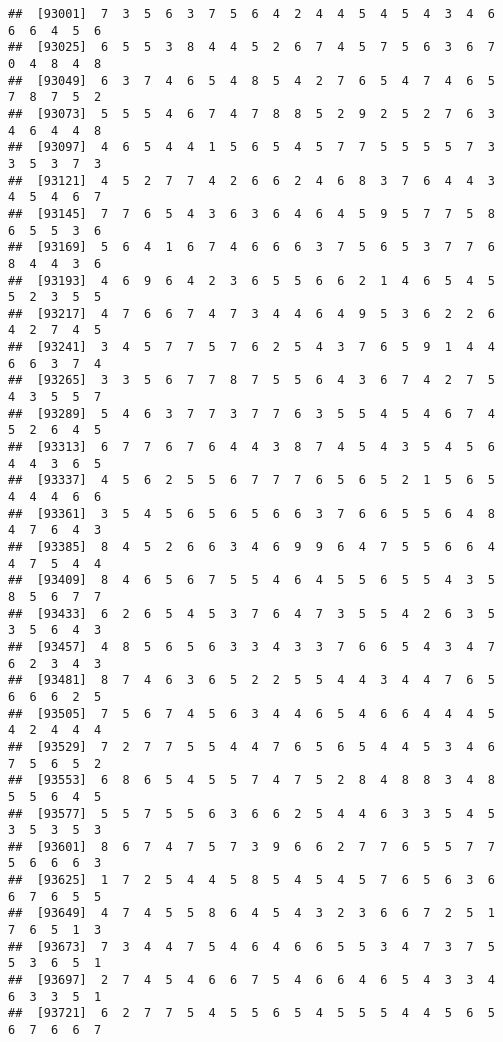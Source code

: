 \documentclass[
]{book}
\begin{document}
\begin{verbatim}
##  [93001]  7  3  5  6  3  7  5  6  4  2  4  4  5  4  5  4  3  4  6  6  6  4  5  6
##  [93025]  6  5  5  3  8  4  4  5  2  6  7  4  5  7  5  6  3  6  7  0  4  8  4  8
##  [93049]  6  3  7  4  6  5  4  8  5  4  2  7  6  5  4  7  4  6  5  7  8  7  5  2
##  [93073]  5  5  5  4  6  7  4  7  8  8  5  2  9  2  5  2  7  6  3  4  6  4  4  8
##  [93097]  4  6  5  4  4  1  5  6  5  4  5  7  7  5  5  5  5  7  3  3  5  3  7  3
##  [93121]  4  5  2  7  7  4  2  6  6  2  4  6  8  3  7  6  4  4  3  4  5  4  6  7
##  [93145]  7  7  6  5  4  3  6  3  6  4  6  4  5  9  5  7  7  5  8  6  5  5  3  6
##  [93169]  5  6  4  1  6  7  4  6  6  6  3  7  5  6  5  3  7  7  6  8  4  4  3  6
##  [93193]  4  6  9  6  4  2  3  6  5  5  6  6  2  1  4  6  5  4  5  5  2  3  5  5
##  [93217]  4  7  6  6  7  4  7  3  4  4  6  4  9  5  3  6  2  2  6  4  2  7  4  5
##  [93241]  3  4  5  7  7  5  7  6  2  5  4  3  7  6  5  9  1  4  4  6  6  3  7  4
##  [93265]  3  3  5  6  7  7  8  7  5  5  6  4  3  6  7  4  2  7  5  4  3  5  5  7
##  [93289]  5  4  6  3  7  7  3  7  7  6  3  5  5  4  5  4  6  7  4  5  2  6  4  5
##  [93313]  6  7  7  6  7  6  4  4  3  8  7  4  5  4  3  5  4  5  6  4  4  3  6  5
##  [93337]  4  5  6  2  5  5  6  7  7  7  6  5  6  5  2  1  5  6  5  4  4  4  6  6
##  [93361]  3  5  4  5  6  5  6  5  6  6  3  7  6  6  5  5  6  4  8  4  7  6  4  3
##  [93385]  8  4  5  2  6  6  3  4  6  9  9  6  4  7  5  5  6  6  4  4  7  5  4  4
##  [93409]  8  4  6  5  6  7  5  5  4  6  4  5  5  6  5  5  4  3  5  8  5  6  7  7
##  [93433]  6  2  6  5  4  5  3  7  6  4  7  3  5  5  4  2  6  3  5  3  5  6  4  3
##  [93457]  4  8  5  6  5  6  3  3  4  3  3  7  6  6  5  4  3  4  7  6  2  3  4  3
##  [93481]  8  7  4  6  3  6  5  2  2  5  5  4  4  3  4  4  7  6  5  6  6  6  2  5
##  [93505]  7  5  6  7  4  5  6  3  4  4  6  5  4  6  6  4  4  4  5  4  2  4  4  4
##  [93529]  7  2  7  7  5  5  4  4  7  6  5  6  5  4  4  5  3  4  6  7  5  6  5  2
##  [93553]  6  8  6  5  4  5  5  7  4  7  5  2  8  4  8  8  3  4  8  5  5  6  4  5
##  [93577]  5  5  7  5  5  6  3  6  6  2  5  4  4  6  3  3  5  4  5  3  5  3  5  3
##  [93601]  8  6  7  4  7  5  7  3  9  6  6  2  7  7  6  5  5  7  7  5  6  6  6  3
##  [93625]  1  7  2  5  4  4  5  8  5  4  5  4  5  7  6  5  6  3  6  6  7  6  5  5
##  [93649]  4  7  4  5  5  8  6  4  5  4  3  2  3  6  6  7  2  5  1  7  6  5  1  3
##  [93673]  7  3  4  4  7  5  4  6  4  6  6  5  5  3  4  7  3  7  5  5  3  6  5  1
##  [93697]  2  7  4  5  4  6  6  7  5  4  6  6  4  6  5  4  3  3  4  6  3  3  5  1
##  [93721]  6  2  7  7  5  4  5  5  6  5  4  5  5  5  4  4  5  6  5  6  7  6  6  7

\end{verbatim}
\end{document}
